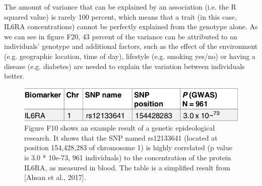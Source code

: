 The amount of variance that can be explained by an association (i.e.
the R squared value) is rarely 100 percent, which means that a trait (in
this case, IL6RA concentrations) cannot be perfectly explained
from the genotype alone. As we can see in figure F20, 
43 percent of the variance can be attributed to an individuals'
genotype and additional factors, 
such as the effect
of the environment (e.g. geographic location, time of day), 
lifestyle (e.g. smoking yes/no) or having a disease (e.g. diabetes) 
are needed to explain the variation between individuals better.

\begin{figure}[!htbp]
  \centering
  \includegraphics[width=\linewidth]{ahsan2017relative_table_2_sub.png}
  \caption{
    Figure F10 shows an example result of a genetic epideological research.
    It shows that the SNP named rs12133641 (located at position 154,428,283
    of chromosome 1) is highly correlated (p value is 3.0 * 10e-73, 
    961 individuals) to the concentration of the protein IL6RA, as measured
    in blood. The table is a simplified result from [Ahsan et al., 2017].
  }
  \label{fig:ahsan2017relative_table_2_sub}
\end{figure}


